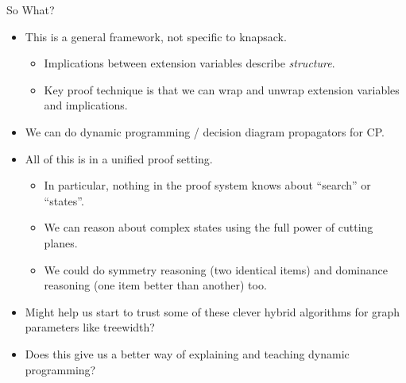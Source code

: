 \documentclass[aspectratio=169,compress,10pt]{beamer}
\begin{document}
\begin{frame}{So What?}
    \begin{itemize}
        \item This is a general framework, not specific to knapsack.
            \begin{itemize}
                \item Implications between extension variables describe \emph{structure}.
                \item Key proof technique is that we can wrap and unwrap extension variables and implications.
            \end{itemize}
        \item We can do dynamic programming / decision diagram propagators for CP.
        \item All of this is in a unified proof setting.
            \begin{itemize}
                \item In particular, nothing in the proof system knows about ``search'' or
                    ``states''.
                \item We can reason about complex states using the full power of cutting
                    planes.
                \item We could do symmetry reasoning (two identical items) and dominance reasoning
                    (one item better than another) too.
            \end{itemize}
        \item Might help us start to trust some of these clever hybrid algorithms
            for graph parameters like treewidth?
        \item Does this give us a better way of explaining and teaching dynamic programming?
    \end{itemize}
\end{frame}
\end{document}
